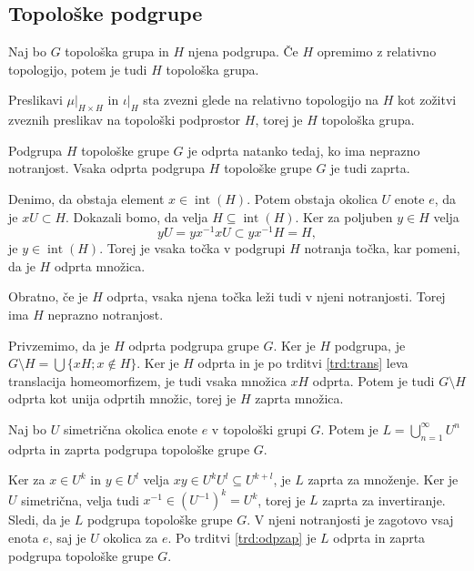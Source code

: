 \documentclass[mat1]{fmfdelo}
\DeclareMathOperator{\interior}{int}
\begin{document}
\subsection{Topološke podgrupe}

\begin{trditev}\label{trd:toppodgrupa}
Naj bo $G$ topološka grupa in $H$ njena podgrupa. Če $H$ opremimo z relativno topologijo, potem je tudi $H$ topološka grupa.
\end{trditev}

\begin{dokaz}
Preslikavi $\mu|_{H \times H}$ in $\iota|_H$ sta zvezni glede na relativno topologijo na $H$ kot zožitvi zveznih preslikav na topološki podprostor $H$, torej je $H$ topološka grupa.
\end{dokaz}


\begin{trditev}\label{trd:odpzap}
Podgrupa $H$ topološke grupe $G$ je odprta natanko tedaj, ko ima neprazno notranjost. Vsaka odprta podgrupa $H$ topološke grupe $G$ je tudi zaprta.
\end{trditev}

\begin{dokaz}
Denimo, da obstaja element $x \in \interior(H)$. Potem obstaja okolica $U$ enote $e$, da je $xU \subset H$. Dokazali bomo, da velja $H \subseteq \interior(H)$. Ker za poljuben $y \in H$ velja \[yU = yx^{-1}xU \subset yx^{-1}H = H,\] je $y \in \interior(H)$. Torej je vsaka točka v podgrupi $H$ notranja točka, kar pomeni, da je $H$ odprta množica.

Obratno, če je $H$ odprta, vsaka njena točka leži tudi v njeni notranjosti. Torej ima $H$ neprazno notranjost.

Privzemimo, da je $H$ odprta podgrupa grupe $G$. Ker je $H$ podgrupa, je $G\setminus H = \bigcup \lbrace xH ; x \notin H \rbrace$. Ker je $H$ odprta in je po trditvi \ref{trd:trans} leva translacija homeomorfizem, je tudi vsaka množica $xH$ odprta. Potem je tudi $G \setminus H$ odprta kot unija odprtih množic, torej je $H$ zaprta množica.
\end{dokaz}

\begin{trditev}\label{trd:podgrupaunija}
Naj bo $U$ simetrična okolica enote $e$ v topološki grupi $G$. Potem je $L = \bigcup_{n=1}^{\infty} U^n$ odprta in zaprta podgrupa topološke grupe $G$.
\end{trditev}

\begin{dokaz}
Ker za $x \in U^k$ in $y \in U^l$ velja $xy \in U^kU^l \subseteq U^{k+l}$, je $L$ zaprta za množenje. Ker je $U$ simetrična, velja tudi $x^{-1} \in (U^{-1})^k = U^k$, torej je $L$ zaprta za invertiranje. Sledi, da je $L$ podgrupa topološke grupe $G$. V njeni notranjosti je zagotovo vsaj enota $e$, saj je $U$ okolica za $e$. Po trditvi \ref{trd:odpzap} je $L$ odprta in zaprta podgrupa topološke grupe $G$.
\end{dokaz}
\end{document}
